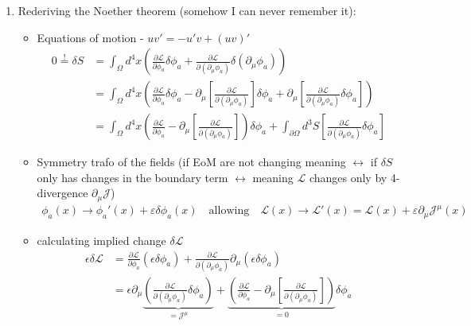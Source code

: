 \documentclass[10pt,a4paper]{article}
\theoremstyle{definition}
\begin{document}
\begin{enumerate}
\item Rederiving the Noether theorem (somehow I can never remember it):
\begin{itemize}
\item Equations of motion - $uv'=-u'v+(uv)'$
\begin{align}
0\overset{!}{=}\delta S
&=\int_\Omega d^4x\left(
\frac{\partial\mathcal{L}}{\partial\phi_a}\delta\phi_a
+\frac{\partial\mathcal{L}}{\partial(\partial_\mu\phi_a)}\delta(\partial_\mu\phi_a)\right)\\
&=\int_\Omega d^4x\left(
\frac{\partial\mathcal{L}}{\partial\phi_a}\delta\phi_a-\partial_\mu\left[\frac{\partial\mathcal{L}}{\partial(\partial_\mu\phi_a)}\right]\delta\phi_a
+\partial_\mu\left[\frac{\partial\mathcal{L}}{\partial(\partial_\mu\phi_a)}\delta\phi_a\right]\right)\\
&=\int_\Omega d^4x\left(
\frac{\partial\mathcal{L}}{\partial\phi_a}-\partial_\mu\left[\frac{\partial\mathcal{L}}{\partial(\partial_\mu\phi_a)}\right]\right)\delta\phi_a
+\int_{\partial\Omega} d^3S\left[\frac{\partial\mathcal{L}}{\partial(\partial_\mu\phi_a)}\delta\phi_a\right]
\end{align}
\item Symmetry trafo of the fields (if EoM are not changing meaning $\leftrightarrow$ if $\delta S$  only has changes in the boundary term $\leftrightarrow$ meaning $\mathcal{L}$ changes only by 4-divergence $\partial_\mu\mathcal{J}$)
\begin{align}
\phi_a(x)\rightarrow\phi_a'(x)+\varepsilon\delta\phi_a(x)\quad\text{allowing}\quad
\mathcal{L}(x)\rightarrow\mathcal{L}'(x)=\mathcal{L}(x)+\varepsilon\partial_\mu\mathcal{J}^\mu(x)
\end{align}
\item calculating implied change $\delta\mathcal{L}$
\begin{align}
\epsilon\delta\mathcal{L}&=\frac{\partial\mathcal{L}}{\partial\phi_a}(\epsilon\delta\phi_a)
+\frac{\partial\mathcal{L}}{\partial(\partial_\mu\phi_a)}\partial_\mu(\epsilon\delta\phi_a)\\
&=\epsilon\partial_\mu\underbrace{\left(\frac{\partial\mathcal{L}}{\partial(\partial_\mu\phi_a)}\delta\phi_a\right)}_{=\mathcal{J}^\mu}
+\underbrace{\left(\frac{\partial\mathcal{L}}{\partial\phi_a}-\partial_\mu\left[\frac{\partial\mathcal{L}}{\partial(\partial_\mu\phi_a)}\right]\right)}_{=0}\delta\phi_a
\end{align}
\end{itemize}





\end{enumerate}
\end{document}
